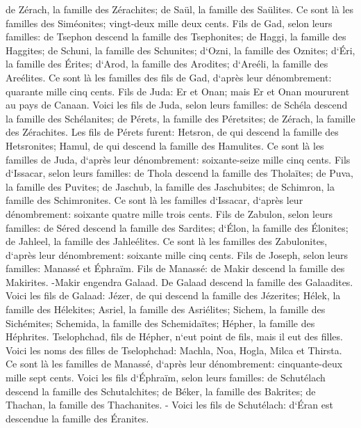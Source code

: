 \verse de Zérach, la famille des Zérachites; de Saül, la famille des Saülites. 
\verse Ce sont là les familles des Siméonites; vingt-deux mille deux cents. 
\verse Fils de Gad, selon leurs familles: de Tsephon descend la famille des Tsephonites; de Haggi, la famille des Haggites; de Schuni, la famille des Schunites; 
\verse d`Ozni, la famille des Oznites; d`Éri, la famille des Érites; 
\verse d`Arod, la famille des Arodites; d`Areéli, la famille des Areélites. 
\verse Ce sont là les familles des fils de Gad, d`après leur dénombrement: quarante mille cinq cents. 
\verse Fils de Juda: Er et Onan; mais Er et Onan moururent au pays de Canaan. 
\verse Voici les fils de Juda, selon leurs familles: de Schéla descend la famille des Schélanites; de Pérets, la famille des Péretsites; de Zérach, la famille des Zérachites. 
\verse Les fils de Pérets furent: Hetsron, de qui descend la famille des Hetsronites; Hamul, de qui descend la famille des Hamulites. 
\verse Ce sont là les familles de Juda, d`après leur dénombrement: soixante-seize mille cinq cents. 
\verse Fils d`Issacar, selon leurs familles: de Thola descend la famille des Tholaïtes; de Puva, la famille des Puvites; 
\verse de Jaschub, la famille des Jaschubites; de Schimron, la famille des Schimronites. 
\verse Ce sont là les familles d`Issacar, d`après leur dénombrement: soixante quatre mille trois cents. 
\verse Fils de Zabulon, selon leurs familles: de Séred descend la famille des Sardites; d`Élon, la famille des Élonites; de Jahleel, la famille des Jahleélites. 
\verse Ce sont là les familles des Zabulonites, d`après leur dénombrement: soixante mille cinq cents. 
\verse Fils de Joseph, selon leurs familles: Manassé et Éphraïm. 
\verse Fils de Manassé: de Makir descend la famille des Makirites. -Makir engendra Galaad. De Galaad descend la famille des Galaadites. 
\verse Voici les fils de Galaad: Jézer, de qui descend la famille des Jézerites; Hélek, la famille des Hélekites; 
\verse Asriel, la famille des Asriélites; Sichem, la famille des Sichémites; 
\verse Schemida, la famille des Schemidaïtes; Hépher, la famille des Héphrites. 
\verse Tselophchad, fils de Hépher, n`eut point de fils, mais il eut des filles. Voici les noms des filles de Tselophchad: Machla, Noa, Hogla, Milca et Thirsta. 
\verse Ce sont là les familles de Manassé, d`après leur dénombrement: cinquante-deux mille sept cents. 
\verse Voici les fils d`Éphraïm, selon leurs familles: de Schutélach descend la famille des Schutalchites; de Béker, la famille des Bakrites; de Thachan, la famille des Thachanites. - 
\verse Voici les fils de Schutélach: d`Éran est descendue la famille des Éranites. 
